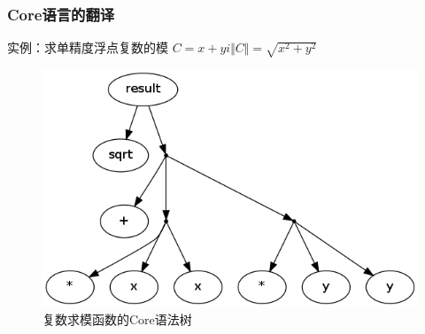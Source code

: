 \documentclass{beamer}
\begin{document}
\begin{frame}
  \frametitle{Core语言的翻译}
  \begin{block}{实例：求单精度浮点复数的模}
    $C=x+yi$\hspace{3cm}$\Vert C \Vert = \sqrt{x^2+y^2}$
    
  \end{block}
  \pause
  \begin{figure}
    \caption{复数求模函数的Core语法树}
    \includegraphics[scale=0.2]{images/complex-length.png}
  \end{figure}
\end{frame}
\end{document}
